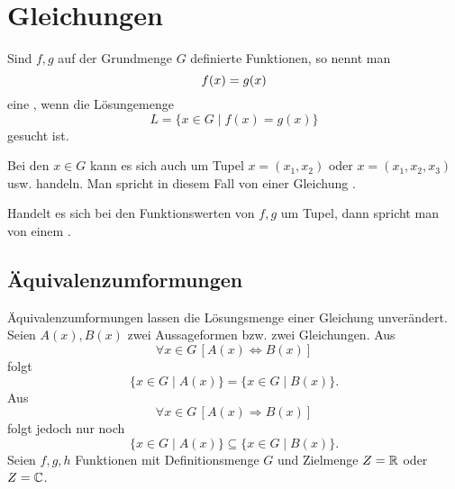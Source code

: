 \section{Gleichungen}
\begin{definition}[Bestimmungsgleichung]
Sind $f,g$ auf der Grundmenge $G$ definierte Funktionen, so nennt
man
\begin{equation}
f(x) = g(x)\\
\end{equation}
eine ,
wenn die Lösungemenge
\begin{equation}
L = \{x\in G\mid f(x)=g(x)\}
\end{equation}
gesucht ist.
\end{definition}
Bei den $x\in G$ kann es sich auch um Tupel $x=(x_1,x_2)$ oder
$x=(x_1,x_2,x_3)$ usw. handeln. Man spricht in diesem Fall
von einer Gleichung .

Handelt es sich bei den Funktionswerten von $f,g$ um Tupel,
dann spricht man von einem
.

\subsection{Äquivalenzumformungen}

Äquivalenzumformungen lassen die Lösungsmenge einer Gleichung
unverändert. Seien $A(x),B(x)$ zwei Aussageformen bzw. zwei
Gleichungen. Aus
\begin{equation}
\forall x{\in}G\,[A(x)\Longleftrightarrow B(x)]
\end{equation}
folgt
\begin{equation}
\{x\in G\mid A(x)\} = \{x\in G\mid B(x)\}.
\end{equation}
Aus
\begin{equation}
\forall x{\in} G\,[A(x)\Longrightarrow B(x)]
\end{equation}
folgt jedoch nur noch
\begin{equation}
\{x\in G\mid A(x)\}\subseteq\{x\in G\mid B(x)\}.
\end{equation}
Seien $f,g,h$ Funktionen mit Definitionsmenge $G$ und
Zielmenge $Z=\mathbb R$ oder $Z=\mathbb C$.

